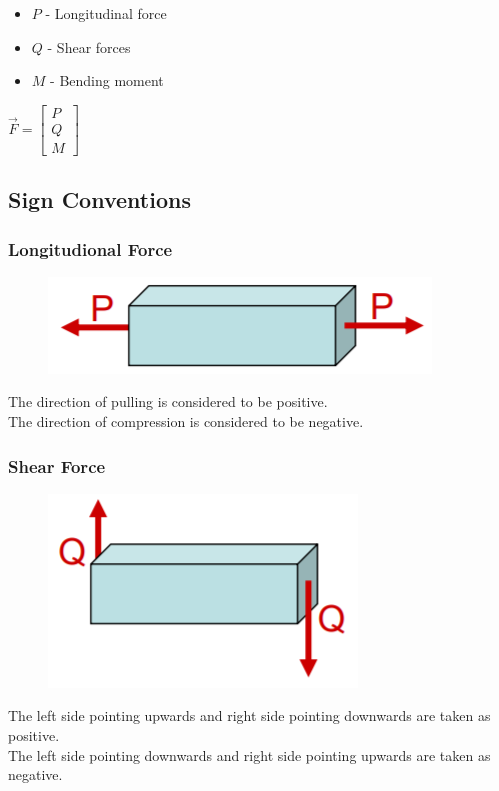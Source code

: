 \documentclass[class=report, crop=false, 12pt,a4paper]{standalone}
\begin{document}
\begin{itemize}[noitemsep]
  \item $P$ - Longitudinal force
  \item $Q$ - Shear forces
  \item $M$ - Bending moment
\end{itemize}
\begin{center}
  $\vec{F} = \left[ \begin{array}{ccccccc} P \\ Q \\ M \end{array}\right]$
\end{center}
\subsection{Sign Conventions}
\subsubsection{Longitudional Force}
\begin{figure}[H]
  \centering
  \includegraphics[width = 0.4 \textwidth]{../img/signconventionlongitudionalforce.PNG}
\end{figure}
The direction of pulling is considered to be positive.\\
The direction of compression is considered to be negative.
\subsubsection{Shear Force}
\begin{figure}[H]
  \centering
  \includegraphics[width = 0.4 \textwidth]{../img/signconventionshearforce.PNG}
\end{figure}
The left side pointing upwards and right side pointing downwards are taken as positive.\\
The left side pointing downwards and right side pointing upwards are taken as negative.
\end{document}
